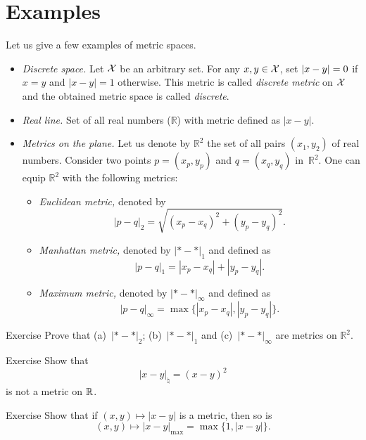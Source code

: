 \section{Examples}\label{sec:examples(metric-spaces)}

Let us give a few examples of metric spaces.

\begin{itemize}
\item\emph{Discrete space.}\label{page:Discrete metric} Let $\mathcal X$ be an arbitrary set. 
For any $x,y\z\in\c X$, 
set $|x-y|\z=0$ if $x=y$ and $|x-y|=1$ otherwise.
This metric is called \emph{discrete metric} on $\mathcal X$ and the obtained metric space is called \emph{discrete}.
\item{}\emph{Real line.} 
Set of all real numbers ($\mathbb{R}$) with metric defined as 
$|x-y|$.
\item {}\emph{Metrics on the plane.}\label{page:Metrics on the plane}
Let us denote by $\mathbb{R}^2$ the set of all pairs $(x_1,y_2)$ of real numbers.
Consider two points $p=(x_p,y_p)$ and $q=(x_q,y_q)$  in~$\mathbb{R}^2$.
One can equip $\mathbb{R}^2$ with the following metrics:
\begin{itemize}
\item{}\emph{Euclidean metric,} denoted by 
$$|p-q|_2=\sqrt{(x_p-x_q)^2+(y_p-y_q)^2}.$$
\item\label{Manhattan plane}\emph{Manhattan metric,} denoted by $|{*}-{*}|_1$ and defined as 
$$|p-q|_1=|x_p-x_q|+|y_p-y_q|.$$
\item{}\emph{Maximum metric,} denoted by $|{*}-{*}|_\infty$ and defined as 
$$|p-q|_\infty=\max\{|x_p-x_q|,|y_p-y_q|\}.$$
\end{itemize}
\end{itemize}

\begin{thm}{Exercise}\label{ex:d1+d2+dinfty}
Prove that (a)~$|{*}-{*}|_2$; (b)~$|{*}-{*}|_1$ and (c)~$|{*}-{*}|_\infty$ are metrics on $\mathbb{R}^2$.
\end{thm}

\begin{thm}{Exercise}\label{ex:not-a-metric}
Show that 
\[|x-y|_{\natural}=(x-y)^2\]
is not a metric on $\mathbb{R}$.
\end{thm}

\begin{thm}{Exercise}\label{ex:metric}
Show that if $(x,y)\mapsto |{x}-{y}|$ is a metric, then so is 
\[(x,y)\mapsto |{x}-{y}|_{\max}=\max\{1,|{x}-{y}|\}.\] 
\end{thm}


